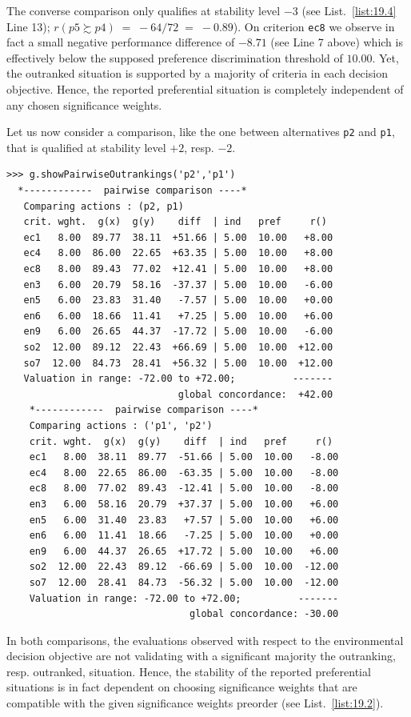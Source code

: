 The converse comparison only qualifies at stability level $-3$ (see List.~\vref{list:19.4} Line 13); $r(p5 \succsim p4)\; =\; -64/72\; =\; -0.89$). On criterion \texttt{ec8} we observe in fact a small negative performance difference of $-8.71$ (see Line 7 above) which is effectively below the supposed preference discrimination threshold of $10.00$. Yet, the outranked situation is supported by a majority of criteria in each decision objective. Hence, the reported preferential situation is completely independent of any chosen significance weights.

Let us now consider a comparison, like the one between alternatives \texttt{p2} and \texttt{p1}, that is qualified at stability level $+2$, resp. $-2$.
\begin{lstlisting}[caption={Comparison of alternatives \texttt{p2} and \texttt{p1}},label=list:19.5]
>>> g.showPairwiseOutrankings('p2','p1')
  *------------  pairwise comparison ----*
   Comparing actions : (p2, p1)
   crit. wght.  g(x)  g(y)    diff  | ind   pref     r()
   ec1   8.00  89.77  38.11  +51.66 | 5.00  10.00   +8.00
   ec4   8.00  86.00  22.65  +63.35 | 5.00  10.00   +8.00
   ec8   8.00  89.43  77.02  +12.41 | 5.00  10.00   +8.00
   en3   6.00  20.79  58.16  -37.37 | 5.00  10.00   -6.00
   en5   6.00  23.83  31.40   -7.57 | 5.00  10.00   +0.00
   en6   6.00  18.66  11.41   +7.25 | 5.00  10.00   +6.00
   en9   6.00  26.65  44.37  -17.72 | 5.00  10.00   -6.00
   so2  12.00  89.12  22.43  +66.69 | 5.00  10.00  +12.00
   so7  12.00  84.73  28.41  +56.32 | 5.00  10.00  +12.00
   Valuation in range: -72.00 to +72.00;          -------
                              global concordance:  +42.00
    *------------  pairwise comparison ----*
    Comparing actions : ('p1', 'p2')
    crit. wght.  g(x)  g(y)    diff  | ind   pref     r()
    ec1   8.00  38.11  89.77  -51.66 | 5.00  10.00   -8.00
    ec4   8.00  22.65  86.00  -63.35 | 5.00  10.00   -8.00
    ec8   8.00  77.02  89.43  -12.41 | 5.00  10.00   -8.00
    en3   6.00  58.16  20.79  +37.37 | 5.00  10.00   +6.00
    en5   6.00  31.40  23.83   +7.57 | 5.00  10.00   +6.00 
    en6   6.00  11.41  18.66   -7.25 | 5.00  10.00   +0.00
    en9   6.00  44.37  26.65  +17.72 | 5.00  10.00   +6.00
    so2  12.00  22.43  89.12  -66.69 | 5.00  10.00  -12.00
    so7  12.00  28.41  84.73  -56.32 | 5.00  10.00  -12.00
    Valuation in range: -72.00 to +72.00;          -------
                                global concordance: -30.00
\end{lstlisting}

In both comparisons, the evaluations observed with respect to the environmental decision objective are not validating with a significant majority the outranking, resp. outranked, situation. Hence, the stability of the reported preferential situations is in fact dependent on choosing significance weights that are compatible with the given significance weights preorder (see List.~\vref{list:19.2}).

